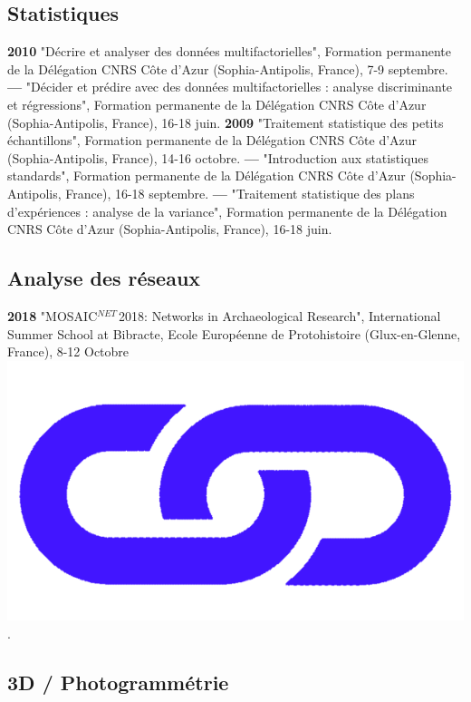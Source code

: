 \documentclass{article}
\begin{document}
\subsection*{Statistiques}

\textbf{2010 }"Décrire et analyser des données multifactorielles", Formation permanente de la Délégation CNRS Côte d'Azur (Sophia-Antipolis, France), 7-9 septembre.
\smallbreak
\textbf{--- }"Décider et prédire avec des données multifactorielles : analyse discriminante et régressions", Formation permanente de la Délégation CNRS Côte d'Azur (Sophia-Antipolis, France), 16-18 juin.
\smallbreak
\textbf{2009 }"Traitement statistique des petits échantillons", Formation permanente de la Délégation CNRS Côte d'Azur (Sophia-Antipolis, France), 14-16 octobre.
\smallbreak
\textbf{--- }"Introduction aux statistiques standards", Formation permanente de la Délégation CNRS Côte d'Azur (Sophia-Antipolis, France), 16-18 septembre.
\smallbreak
\textbf{--- }"Traitement statistique des plans d'expériences : analyse de la variance", Formation permanente de la Délégation CNRS Côte d'Azur (Sophia-Antipolis, France), 16-18 juin.
\smallbreak

\subsection*{Analyse des réseaux}

\textbf{2018 }"MOSAIC${}^{NET\ }$2018: Networks in Archaeological Research", International Summer School at Bibracte, Ecole Europ\'{e}enne de Protohistoire (Glux-en-Glenne, France), 8-12 Octobre \href{https://www.ufg.uni-kiel.de/en/news_expired/events-ufg/conferences-exhibitions/mosaic-2018}{\includegraphics[scale=0.02]{link_darkblue.png}}.

\subsection*{3D / Photogrammétrie}
\end{document}
